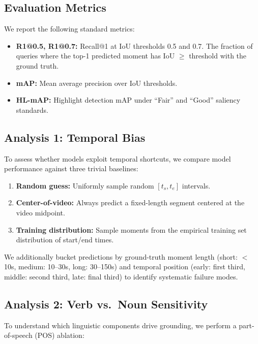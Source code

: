 \documentclass[10pt,twocolumn]{article}
\begin{document}
\subsection{Evaluation Metrics}
\label{sec:metrics}

We report the following standard metrics:
\begin{itemize}[nosep,leftmargin=*]
  \item \textbf{R1@0.5, R1@0.7:} Recall@1 at IoU thresholds 0.5 and 0.7. The fraction of queries where the top-1 predicted moment has IoU $\geq$ threshold with the ground truth.
  \item \textbf{mAP:} Mean average precision over IoU thresholds.
  \item \textbf{HL-mAP:} Highlight detection mAP under ``Fair'' and ``Good'' saliency standards.
\end{itemize}

\subsection{Analysis 1: Temporal Bias}
\label{sec:method_bias}

To assess whether models exploit temporal shortcuts, we compare model performance against three trivial baselines:

\begin{enumerate}[nosep,leftmargin=*]
  \item \textbf{Random guess:} Uniformly sample random $[t_s, t_e]$ intervals.
  \item \textbf{Center-of-video:} Always predict a fixed-length segment centered at the video midpoint.
  \item \textbf{Training distribution:} Sample moments from the empirical training set distribution of start/end times.
\end{enumerate}

We additionally bucket predictions by ground-truth moment length (short: $<$10s, medium: 10--30s, long: 30--150s) and temporal position (early: first third, middle: second third, late: final third) to identify systematic failure modes.

\subsection{Analysis 2: Verb vs.\ Noun Sensitivity}
\label{sec:method_vn}

To understand which linguistic components drive grounding, we perform a part-of-speech (POS) ablation:
\end{document}
